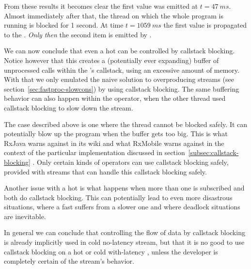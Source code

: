From these results it becomes clear the first value was emitted at $t=47\ ms$. Almost immediately after that, the thread on which the whole program is running is blocked for 1 second. At time $t=1059\ ms$ the first value is propagated to the . \emph{Only then} the second item is emitted by .

We can now conclude that even a hot \obs can be controlled by callstack blocking. Notice however that this creates a (potentially ever expanding) buffer of unprocessed  calls within the 's callstack, using an excessive amount of memory. With that we only emulated the naive solution to overproducing streams (see section~\ref{sec:fastproc-slowcons}) by using callstack blocking. The same buffering behavior can also happen within the  operator, when the other thread used callstack blocking to slow down the stream.

The case described above is one where the thread cannot be blocked safely. It can potentially blow up the program when the buffer gets too big. This is what RxJava warns against in its wiki\cite{RxJava-Wiki-Callstack-Blocking} and what RxMobile warns against in the context of the particular  implementation discussed in section~\ref{subsec:callstack-blocking} \cite{RxMobile}. Only certain kinds of operators can use callstack blocking safely, provided with streams that can handle this callstack blocking safely.

Another issue with a hot \obs is what happens when more than one \obv is subscribed and both do callstack blocking. This can potentially lead to even more disastrous situations, where a fast \obv suffers from a slower one and where deadlock situations are inevitable.

In general we can conclude that controlling the flow of data by callstack blocking is already implicitly used in cold no-latency stream, but that it is no good to use callstack blocking on a hot or cold with-latency \obs, unless the developer is completely certain of the stream's behavior.



























